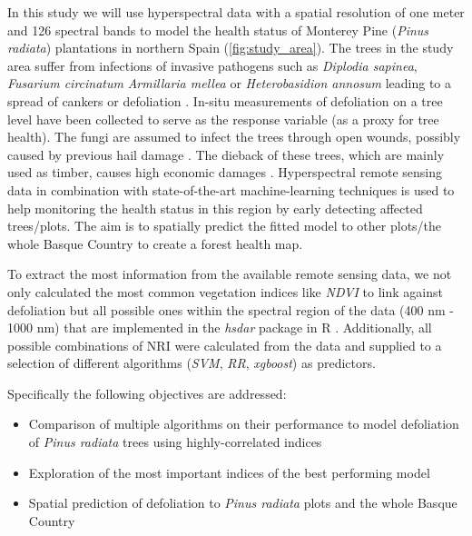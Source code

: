\documentclass[review]{elsarticle}
\begin{document}
In this study we will use hyperspectral data with a spatial resolution of one meter and 126 spectral bands to model the health status of Monterey Pine (\textit{Pinus radiata}) plantations in northern Spain (\autoref{fig:study_area}).
The trees in the study area suffer from infections of invasive pathogens such as \textit{Diplodia sapinea}, \textit{Fusarium circinatum} \textit{Armillaria mellea} or \textit{Heterobasidion annosum} leading to a spread of cankers or defoliation \citep{mesanzaNativeRhizobacteriaBiocontrol2016, iturritxaBiocontrolFusariumCircinatum2017}.
In-situ measurements of defoliation on a tree level have been collected to serve as the response variable (as a proxy for tree health).
The fungi are assumed to infect the trees through open wounds, possibly caused by previous hail damage \citep{Iturritxa2014}.
The dieback of these trees, which are mainly used as timber, causes high economic damages \citep{ganleyGlobalClimaticRisk2009}.
Hyperspectral remote sensing data in combination with state-of-the-art machine-learning techniques is used to help monitoring the health status in this region by early detecting affected trees/plots.
The aim is to spatially predict the fitted model to other plots/the whole Basque Country to create a forest health map.


To extract the most information from the available remote sensing data, we not only calculated the most common vegetation indices like \textit{NDVI} to link against defoliation but all possible ones within the spectral region of the data (400 nm - 1000 nm) that are implemented in the \textit{hsdar} package in R \citep{hsdar}.
Additionally, all possible combinations of \ac{NRI} were calculated from the data and supplied to a selection of different algorithms (\textit{\ac{SVM}}, \textit{\ac{RR}}, \textit{xgboost}) as predictors.



Specifically the following objectives are addressed:

\begin{itemize}
	\item Comparison of multiple algorithms on their performance to model defoliation of \textit{Pinus radiata} trees using highly-correlated indices
	\item Exploration of the most important indices of the best performing model
	\item Spatial prediction of defoliation to \textit{Pinus radiata} plots and the whole Basque Country
\end{itemize}
\end{document}
